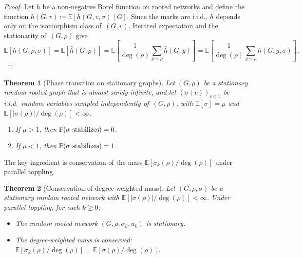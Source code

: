 \documentclass[11pt]{amsart}
\theoremstyle{plain}
\newtheorem{theorem}{Theorem}[section]
\theoremstyle{definition}
\newcommand{\E}{\mathbb{E}}
\renewcommand{\P}{\mathbb{P}}
\begin{document}
	\begin{proof}
		Let $h$ be a non-negative Borel function on rooted networks and define the function $\bar{h}(G,v) \coloneqq \E[h(G,v,\sigma) \mid G]$. Since the marks are i.i.d., $\bar{h}$ depends only on the isomorphism class of~$(G,v)$. Iterated expectation and the stationarity of~$(G,\rho)$ give 
		\[
		\E[h(G,\rho,\sigma)]=\E[\bar{h}(G,\rho)]=\E[\frac{1}{\deg(\rho)}\sum_{y\sim\rho}\bar{h}(G,y)]=\E[\frac{1}{\deg(\rho)}\sum_{y\sim\rho}h(G,y,\sigma)]\,.
		\]
	\end{proof}
	
	\begin{theorem}[Phase transition on stationary graphs]\label{thm:stationary-phase}
		Let $(G,\rho)$ be a stationary random rooted graph that is almost surely infinite, and let $(\sigma(v))_{v\in V}$ be i.i.d.\ random variables sampled independently of~$(G,\rho)$, with $\E[\sigma] = \mu$ and $\E[|\sigma(\rho)|/\deg(\rho)] < \infty$.
		\begin{enumerate}[label=\textup{(\roman*)}]
			\item If $\mu > 1$, then $\P(\sigma \textup{ stabilizes}) = 0$.
			\item If $\mu < 1$, then $\P(\sigma \textup{ stabilizes}) = 1$.
		\end{enumerate}
	\end{theorem}
	
	The key ingredient is conservation of the mass $\E[\sigma_k(\rho)/\deg(\rho)]$ under parallel toppling.
	
	\begin{theorem}[Conservation of degree-weighted mass]\label{thm:stationary-toppling}
		Let $(G,\rho,\sigma)$ be a stationary random rooted network with $\E[|\sigma(\rho)|/\deg(\rho)] < \infty$. Under parallel toppling, for each $k \geq 0$:
		\begin{itemize}
			\item[\em (a)] The random rooted network $(G,\rho,\sigma_k,u_k)$ is stationary.
			\item[\em (b)] The degree-weighted mass is conserved: $\E[\sigma_k(\rho)/\deg(\rho)] = \E[\sigma(\rho)/\deg(\rho)]$.
		\end{itemize}
	\end{theorem}
	
\end{document}
